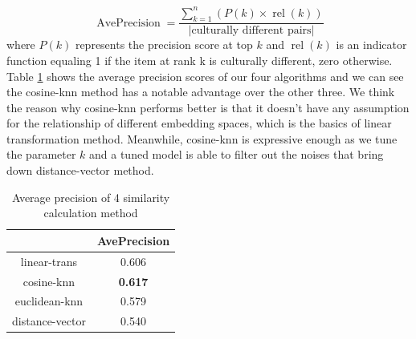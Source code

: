 \begin{equation*}
 \operatorname{AvePrecision} = \frac{\sum_{k=1}^n (P(k) \times \operatorname{rel}(k))}{|\mbox{culturally different pairs}|} \!
\end{equation*}
where $P(k)$ represents the precision score at top $k$ and 
$\operatorname{rel}(k)$ is an indicator function equaling 1 if the item at rank k is culturally different,  zero otherwise. Table \ref{tab:ap} shows the average precision scores of our four algorithms and we can see the cosine-knn method has a notable advantage over the other three.
We think the reason why cosine-knn performs better is that it doesn't have any assumption for the relationship of different embedding spaces, which is the basics of linear transformation method. Meanwhile, cosine-knn is expressive enough as we tune the parameter $k$ and a tuned model is able to filter out the noises that bring down distance-vector method.
\begin{table}
\centering
\small
\begin{tabular}{|c|c|}
\hline
 & AvePrecision \\ \hline
 \hline
 linear-trans & 0.606 \\
 \hline
 cosine-knn & {\bf 0.617} \\
 \hline
 euclidean-knn & 0.579\\
 \hline
 distance-vector & 0.540\\ 
\hline
\end{tabular}
\caption{Average precision of 4 similarity calculation method}
\label{tab:ap}
\end{table}


